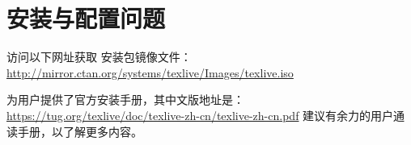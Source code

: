 %
%
%
%

\section{安装与配置问题}
\label{sec:install}





%



访问以下网址获取 \TeXLive{} 安装包镜像文件：
\url{http://mirror.ctan.org/systems/texlive/Images/texlive.iso}


\TeXLive{} 为用户提供了官方安装手册，其中文版地址是：
\url{https://tug.org/texlive/doc/texlive-zh-cn/texlive-zh-cn.pdf}
建议有余力的用户通读手册，以了解更多内容。

